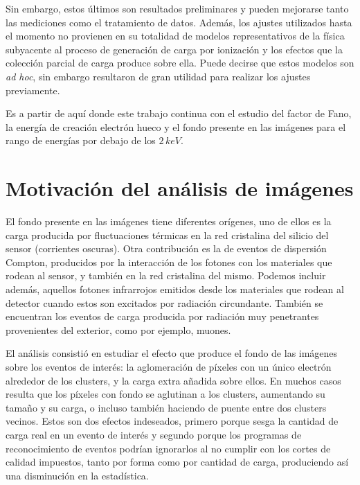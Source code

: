 Sin embargo, estos últimos son resultados preliminares y pueden mejorarse tanto las mediciones como el tratamiento de datos. Además, los ajustes utilizados hasta el momento no provienen en su totalidad de modelos representativos de la física subyacente al proceso de generación de carga por ionización y los efectos que la colección parcial de carga produce sobre ella. Puede decirse que estos modelos son \textit{ad hoc}, sin embargo resultaron de gran utilidad para realizar los ajustes previamente.

Es a partir de aquí donde este trabajo continua con el estudio del factor de Fano, la energía de creación electrón hueco y el fondo presente en las imágenes para el rango de energías por debajo de los $2\,\si{keV}$.

\section{Motivación del análisis de imágenes}
\noindent El fondo presente en las imágenes tiene diferentes orígenes, uno de ellos es la carga producida por fluctuaciones térmicas en la red cristalina del silicio del sensor (corrientes oscuras). Otra contribución es la de eventos de dispersión Compton, producidos por la interacción de los fotones con los materiales que rodean al sensor, y también en la red cristalina del mismo. Podemos incluir además, aquellos fotones infrarrojos emitidos desde los materiales que rodean al detector cuando estos son excitados por radiación circundante. También se encuentran los eventos de carga producida por radiación muy penetrantes provenientes del exterior, como por ejemplo, muones.

El análisis consistió en estudiar el efecto que produce el fondo de las imágenes sobre los eventos de interés: la aglomeración de píxeles con un único electrón alrededor de los clusters, y la carga extra añadida sobre ellos. En muchos casos resulta que los píxeles con fondo se aglutinan a los clusters, aumentando su tamaño y su carga, o incluso también haciendo de puente entre dos clusters vecinos. Estos son dos efectos indeseados, primero porque sesga la cantidad de carga real en un evento de interés y segundo porque los programas de reconocimiento de eventos podrían %
ignorarlos al no cumplir con los cortes de calidad impuestos, tanto por forma como por cantidad de carga, produciendo así una disminución en la estadística.

